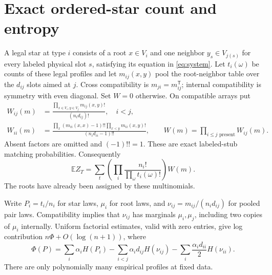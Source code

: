 \documentclass[11pt]{article}
\newcommand{\E}{\mathbb E}
\begin{document}
\section{Exact ordered-star count and entropy}
A legal star at type $i$ consists of a root $x\in V_i$ and one neighbor $y_s\in V_{j(s)}$ for every labeled physical slot $s$, satisfying its equation in \eqref{eq:system}. Let $t_i(\omega)$ be counts of these legal profiles and let $m_{ij}(x,y)$ pool the root-neighbor table over the $d_{ij}$ slots aimed at $j$. Cross compatibility is $m_{ji}=m_{ij}^{\mathsf T}$; internal compatibility is symmetry with even diagonal. Set $W=0$ otherwise. On compatible arrays put
\begin{align}
 W_{ij}(m)&=\frac{\prod_{x\in V_i,y\in V_j}m_{ij}(x,y)!}{(n_id_{ij})!},\quad i<j,\label{eq:cross}\\
 W_{ii}(m)&=\frac{\prod_x(m_{ii}(x,x)-1)!!\prod_{x<y}m_{ii}(x,y)!}{(n_id_{ii}-1)!!},
 \qquad W(m)=\prod_{i\le j\text{ present}}W_{ij}(m).
 \label{eq:internal}
\end{align}
Absent factors are omitted and $(-1)!!=1$. These are exact labeled-stub matching probabilities. Consequently
\begin{equation}\label{eq:types}
 \E Z_T=\sum_t\left(\prod_i\frac{n_i!}{\prod_\omega t_i(\omega)!}\right)W(m).
\end{equation}
The roots have already been assigned by these multinomials.

Write $P_i=t_i/n_i$ for star laws, $\mu_i$ for root laws, and $\nu_{ij}=m_{ij}/(n_id_{ij})$ for pooled pair laws. Compatibility implies that $\nu_{ij}$ has marginals $\mu_i,\mu_j$, including two copies of $\mu_i$ internally. Uniform factorial estimates, valid with zero entries, give log contribution $n\Phi+O(\log(n+1))$, where
\begin{equation}\label{eq:entropy}
 \Phi(P)=\sum_i\alpha_iH(P_i)
 -\sum_{i<j}\alpha_id_{ij}H(\nu_{ij})
 -\sum_i\frac{\alpha_id_{ii}}2H(\nu_{ii}).
\end{equation}
There are only polynomially many empirical profiles at fixed data.
\end{document}
